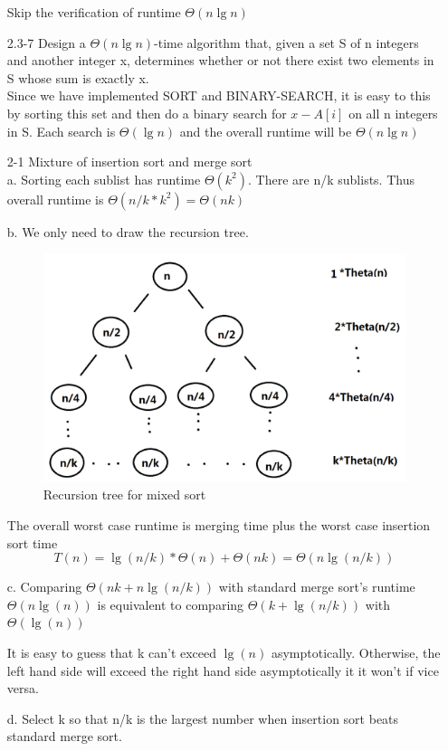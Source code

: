 \documentclass[]{article}
\begin{document}
\begin{enumerate}
Skip the verification of runtime $\Theta (n\lg n)$

\item[2.3-7] Design a $\Theta (n\lg n)$-time algorithm that, given a set S of n integers and another integer x, determines whether or not there exist two elements in S whose sum is exactly x.\\

Since we have implemented SORT and BINARY-SEARCH, it is easy to this by sorting this set and then do a binary search for $x-A[i]$ on all n integers in S. Each search is $\Theta (\lg n)$ and the overall runtime will be $\Theta (n\lg n)$

\item[2-1] Mixture of insertion sort and merge sort\\
a. Sorting each sublist has runtime $\Theta(k^2)$. There are n/k sublists. Thus overall runtime is $\Theta(n/k*k^2) = \Theta(nk)$

b. We only need to draw the recursion tree.

\begin{figure}[!h]
\centering
\includegraphics[width=0.7\linewidth]{./2-1RecursionTree}
\caption{Recursion tree for mixed sort}
\label{fig:2-1RecursionTree}
\end{figure}

The overall worst case runtime is merging time plus the worst case insertion sort time $$T(n) = \lg (n/k) * \Theta(n) + \Theta(nk) = \Theta(n\lg(n/k)) $$

c. Comparing $ \Theta(nk + n\lg(n/k)) $ with standard merge sort's runtime $\Theta(n\lg(n))$ is equivalent to comparing $ \Theta(k+\lg(n/k)) $ with $\Theta(\lg(n) )$

It is easy to guess that k can't exceed $\lg(n)$ asymptotically. Otherwise, the left hand side will exceed the right hand side asymptotically it it won't if vice versa.

d. Select k so that n/k is the largest number when insertion sort beats standard merge sort.


\end{enumerate}
\end{document}
